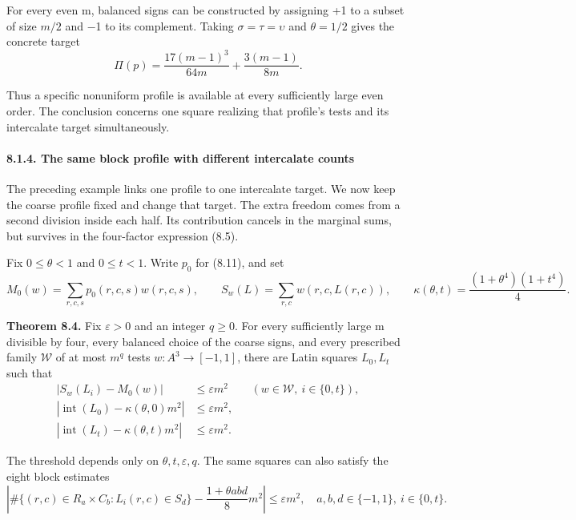 \documentclass[english,11pt,a4paper]{article}
\begin{document}
For every even m, balanced signs can be constructed by assigning +1 to a subset of size \(m/2\) and −1 to its complement. Taking \(\sigma=\tau=\upsilon\) and \(\theta=1/2\) gives the concrete target
\[\Pi(p)=\frac{17(m-1)^3}{64m}+\frac{3(m-1)}{8m}.                     \tag{8.15}\]

Thus a specific nonuniform profile is available at every sufficiently large even order. The conclusion concerns one square realizing that profile's tests and its intercalate target simultaneously.

\paragraph{8.1.4. The same block profile with different intercalate counts}\label{the-same-block-profile-with-different-intercalate-counts}

The preceding example links one profile to one intercalate target. We now keep the coarse profile fixed and change that target. The extra freedom comes from a second division inside each half. Its contribution cancels in the marginal sums, but survives in the four-factor expression (8.5).

Fix \(0\leq\theta<1\) and \(0\leq t<1\). Write \(p_0\) for (8.11), and set
\[M_0(w)=\sum_{r,c,s}p_0(r,c,s)w(r,c,s),\qquad
S_w(L)=\sum_{r,c}w(r,c,L(r,c)),\qquad
\kappa(\theta,t)=\frac{(1+\theta^4)(1+t^4)}4.                 \tag{8.16}\]

\textbf{Theorem 8.4.} Fix \(\varepsilon>0\) and an integer \(q\geq0\). For every sufficiently large m divisible by four, every balanced choice of the coarse signs, and every prescribed family \(\mathcal W\) of at most \(m^q\) tests \(w:A^3\to[-1,1]\), there are Latin squares \(L_0,L_t\) such that
\[\begin{aligned}
|S_w(L_i)-M_0(w)|&\leq\varepsilon m^2
&& (w\in\mathcal W,\ i\in\{0,t\}),\\
|\operatorname{int}(L_0)-\kappa(\theta,0)m^2|&\leq\varepsilon m^2,\\
|\operatorname{int}(L_t)-\kappa(\theta,t)m^2|&\leq\varepsilon m^2.
\end{aligned}                                                   \tag{8.17}\]

The threshold depends only on \(\theta,t,\varepsilon,q\). The same squares can also satisfy the eight block estimates
\[\left|\#\{(r,c)\in R_a\times C_b:L_i(r,c)\in S_d\}
       -\frac{1+\theta abd}{8}m^2\right|\leq\varepsilon m^2,
\quad a,b,d\in\{-1,1\},\ i\in\{0,t\}.                       \tag{8.18}\]
\end{document}
